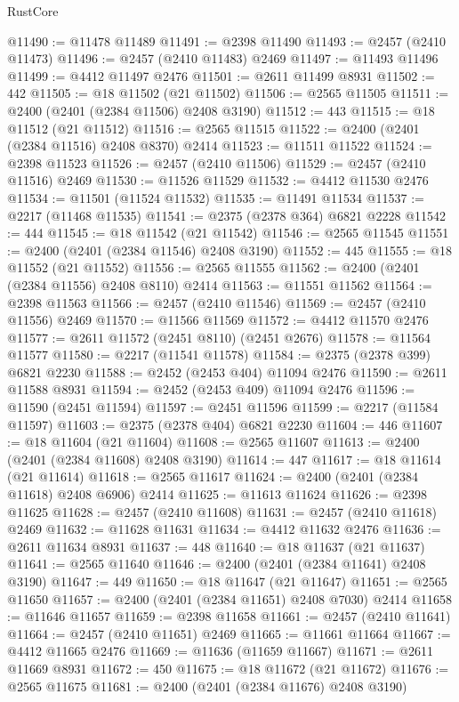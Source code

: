 \begin{lexlean}{RustCore}
\begin{coremodule}
@11490 := @11478 @11489
@11491 := @2398 @11490
@11493 := @2457 (@2410 @11473)
@11496 := @2457 (@2410 @11483) @2469
@11497 := @11493 @11496
@11499 := @4412 @11497 @2476
@11501 := @2611 @11499 @8931
@11502 := 442
@11505 := @18 @11502 (@21 @11502)
@11506 := @2565 @11505
@11511 := @2400 (@2401 (@2384 @11506) @2408 @3190)
@11512 := 443
@11515 := @18 @11512 (@21 @11512)
@11516 := @2565 @11515
@11522 := @2400 (@2401 (@2384 @11516) @2408 @8370) @2414
@11523 := @11511 @11522
@11524 := @2398 @11523
@11526 := @2457 (@2410 @11506)
@11529 := @2457 (@2410 @11516) @2469
@11530 := @11526 @11529
@11532 := @4412 @11530 @2476
@11534 := @11501 (@11524 @11532)
@11535 := @11491 @11534
@11537 := @2217 (@11468 @11535)
@11541 := @2375 (@2378 @364) @6821 @2228
@11542 := 444
@11545 := @18 @11542 (@21 @11542)
@11546 := @2565 @11545
@11551 := @2400 (@2401 (@2384 @11546) @2408 @3190)
@11552 := 445
@11555 := @18 @11552 (@21 @11552)
@11556 := @2565 @11555
@11562 := @2400 (@2401 (@2384 @11556) @2408 @8110) @2414
@11563 := @11551 @11562
@11564 := @2398 @11563
@11566 := @2457 (@2410 @11546)
@11569 := @2457 (@2410 @11556) @2469
@11570 := @11566 @11569
@11572 := @4412 @11570 @2476
@11577 := @2611 @11572 (@2451 @8110) (@2451 @2676)
@11578 := @11564 @11577
@11580 := @2217 (@11541 @11578)
@11584 := @2375 (@2378 @399) @6821 @2230
@11588 := @2452 (@2453 @404) @11094 @2476
@11590 := @2611 @11588 @8931
@11594 := @2452 (@2453 @409) @11094 @2476
@11596 := @11590 (@2451 @11594)
@11597 := @2451 @11596
@11599 := @2217 (@11584 @11597)
@11603 := @2375 (@2378 @404) @6821 @2230
@11604 := 446
@11607 := @18 @11604 (@21 @11604)
@11608 := @2565 @11607
@11613 := @2400 (@2401 (@2384 @11608) @2408 @3190)
@11614 := 447
@11617 := @18 @11614 (@21 @11614)
@11618 := @2565 @11617
@11624 := @2400 (@2401 (@2384 @11618) @2408 @6906) @2414
@11625 := @11613 @11624
@11626 := @2398 @11625
@11628 := @2457 (@2410 @11608)
@11631 := @2457 (@2410 @11618) @2469
@11632 := @11628 @11631
@11634 := @4412 @11632 @2476
@11636 := @2611 @11634 @8931
@11637 := 448
@11640 := @18 @11637 (@21 @11637)
@11641 := @2565 @11640
@11646 := @2400 (@2401 (@2384 @11641) @2408 @3190)
@11647 := 449
@11650 := @18 @11647 (@21 @11647)
@11651 := @2565 @11650
@11657 := @2400 (@2401 (@2384 @11651) @2408 @7030) @2414
@11658 := @11646 @11657
@11659 := @2398 @11658
@11661 := @2457 (@2410 @11641)
@11664 := @2457 (@2410 @11651) @2469
@11665 := @11661 @11664
@11667 := @4412 @11665 @2476
@11669 := @11636 (@11659 @11667)
@11671 := @2611 @11669 @8931
@11672 := 450
@11675 := @18 @11672 (@21 @11672)
@11676 := @2565 @11675
@11681 := @2400 (@2401 (@2384 @11676) @2408 @3190)

\end{coremodule}
\end{lexlean}
